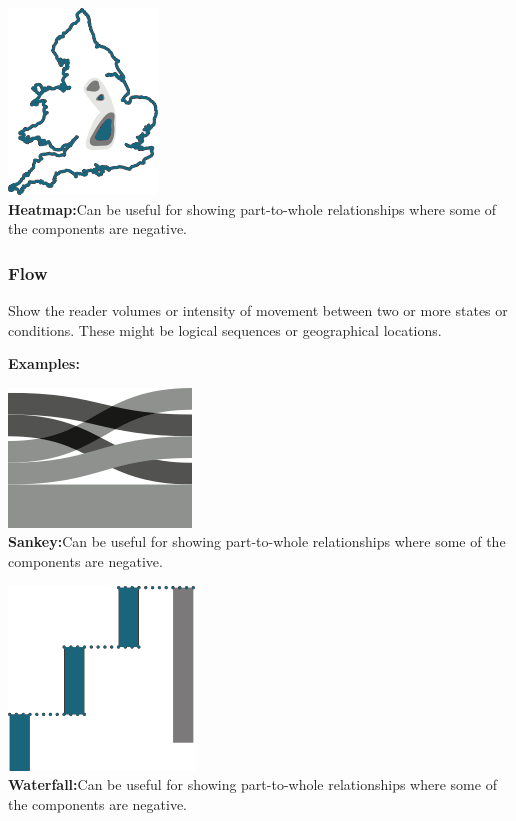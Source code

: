 \documentclass[
  a4paper,
  onecolumn,
  oneside]{book}
\begin{document}
\includegraphics{part1/images/spatial6.png}\\
\textbf{Heatmap:}Can be useful for showing part-to-whole relationships
where some of the components are negative.

\hypertarget{flow}{%
\subsubsection{Flow}\label{flow}}

Show the reader volumes or intensity of movement between two or more
states or conditions. These might be logical sequences or geographical
locations.

\textbf{Examples:}

\includegraphics{part1/images/flow1.png}\\
\textbf{Sankey:}Can be useful for showing part-to-whole relationships
where some of the components are negative.

\includegraphics{part1/images/flow2.png}\\
\textbf{Waterfall:}Can be useful for showing part-to-whole relationships
where some of the components are negative.
\end{document}
